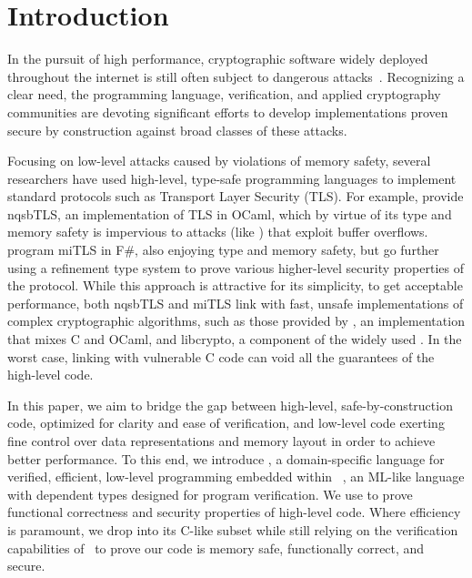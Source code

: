 \section{Introduction}

In the pursuit of high performance, 
cryptographic software widely deployed throughout the internet 
is still often subject to dangerous 
attacks~\cite{ws96,
  freestart, Heartbleed, tlstrunc, BhargavanDFPS14, ap13, POODLE,
  tlsattacker, BEAST, cryptoeprint:2016:475, sweet32, CRIME, polybug2,
  chachaoverflow,
  PincusB04, Szekeres2013,
  AfekS07,UseAfterFreeCWE,
  Dobrovitski03,DoubleFreeCWE,
  IntegerOverflowCWE}. 
Recognizing a clear need, %
the programming language,
verification, and 
applied cryptography communities are 
devoting
significant efforts to develop implementations proven
secure by construction against 
broad classes of these attacks.

Focusing on low-level attacks caused by violations of
memory safety, several researchers have used high-level, type-safe
programming languages to implement standard protocols such as Transport Layer
Security (TLS).
For example, \citet{kaloper2015not} provide nqsbTLS, an implementation of TLS in
OCaml, which by virtue of its type and memory safety is impervious to attacks
(like \citet{Heartbleed}) that exploit buffer overflows.
\citet{bhargavan2014proving} program miTLS
in F\#, also enjoying type and memory safety, but go further using a refinement
type system to prove various higher-level
security properties of the protocol.
%
While this approach is attractive for its simplicity, to get
acceptable performance, both nqsbTLS and miTLS link with fast, unsafe
implementations of complex cryptographic algorithms, such as those provided by
\citet{nocrypto}, an implementation that mixes C and OCaml, and
libcrypto, a component of the widely used \citet{openssl}.
In the worst case, linking with vulnerable C code 
can void all the %
guarantees of the high-level code.

In this paper, we aim to bridge the gap between high-level,
safe-by-construction code, optimized for clarity and ease of
verification, and low-level code exerting fine control
over data representations and memory layout in order to achieve
better performance.
%
To this end, 
we introduce \lowstar, a domain-specific language
for verified, efficient, low-level programming embedded within 
\fstar~\cite{mumon}, an ML-like language with dependent
types designed for program verification.
%
We
use \fstar
to prove functional correctness
and security properties of high-level code. 
%
Where efficiency is paramount, we drop into its C-like \lowstar subset
while still relying on
the verification capabilities of~\fstar
to prove our code is memory safe, functionally correct, and secure.

